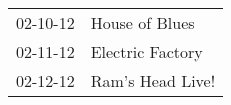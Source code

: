 \begin{supertabular}{p{0.25\columnwidth}p{0.75\columnwidth}}
 02-10-12 &    House of Blues \\
 02-11-12 &  Electric Factory \\
 02-12-12 &  Ram's Head Live! \\
\end{supertabular}
